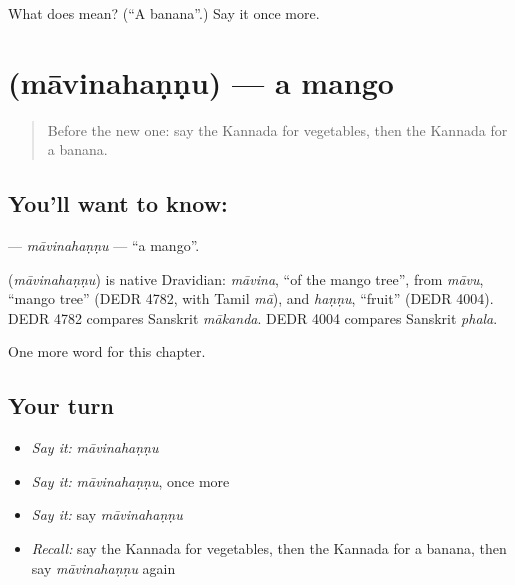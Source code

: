\begin{tcolorbox}[breakable,colback=teal!4,colframe=teal!35!black,title={Before you move on}]
What does  mean? (\textquotedblleft{}A banana\textquotedblright{}.) Say it once more.
\end{tcolorbox}
\section[\texorpdfstring{\kn{ಮಾವಿನಹಣ್ಣು} (māvinahaṇṇu)}{ಮಾವಿನಹಣ್ಣು (māvinahaṇṇu)}]{ (māvinahaṇṇu) — a mango}

\label{lesson:KA-C123-mavinahannu}



\begin{quote}
Before the new one: say the Kannada for vegetables, then the Kannada for a banana.
\end{quote}

\subsection*{You'll want to know: }
\textbf{} — \emph{māvinahaṇṇu} — \textquotedblleft{}a mango\textquotedblright{}.

\begin{cousinweb}
\textbf{} (\emph{māvinahaṇṇu}) is native Dravidian: \emph{māvina}, \textquotedblleft{}of the mango tree\textquotedblright{}, from \emph{māvu}, \textquotedblleft{}mango tree\textquotedblright{} (DEDR 4782, with Tamil \emph{mā}), and \emph{haṇṇu}, \textquotedblleft{}fruit\textquotedblright{} (DEDR 4004). DEDR 4782 compares Sanskrit \emph{mākanda}. DEDR 4004 compares Sanskrit \emph{phala}.
\end{cousinweb}

\begin{grammarlens}[title={What you've built}]
One more word for this chapter.
\end{grammarlens}

\subsection*{Your turn}
\begin{itemize}
\raggedright
  \item \emph{Say it:} \emph{māvinahaṇṇu}
  \item \emph{Say it:} \emph{māvinahaṇṇu}, once more
  \item \emph{Say it:} say \emph{māvinahaṇṇu}
  \item \emph{Recall:} say the Kannada for vegetables, then the Kannada for a banana, then say \emph{māvinahaṇṇu} again
\end{itemize}

